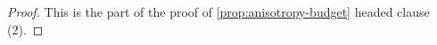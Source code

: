 \begin{proof}
\leanok
This is the part of the proof of \ref{prop:anisotropy-budget} headed clause (2).
\end{proof}

